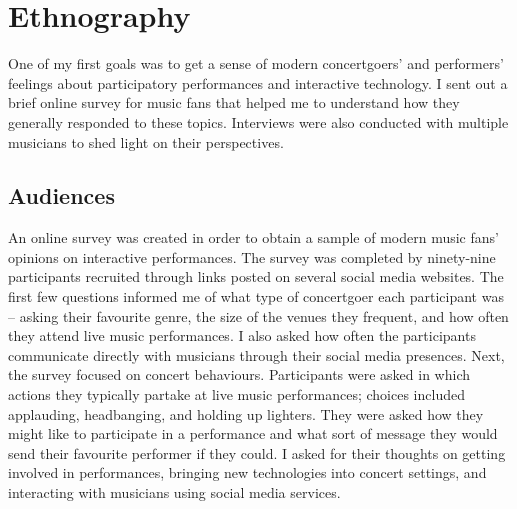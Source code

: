 \chapter{Ethnography}

One of my first goals was to get a sense of modern concertgoers' and performers' feelings about participatory performances and interactive technology. I sent out a brief online survey for music fans that helped me to understand how they generally responded to these topics. Interviews were also conducted with multiple musicians to shed light on their perspectives.

\section{Audiences}

An online survey was created in order to obtain a sample of modern music fans' opinions on interactive performances. The survey was completed by ninety-nine participants recruited through links posted on several social media websites. The first few questions informed me of what type of concertgoer each participant was -- asking their favourite genre, the size of the venues they frequent, and how often they attend live music performances. I also asked how often the participants communicate directly with musicians through their social media presences. Next, the survey focused on concert behaviours. Participants were asked in which actions they typically partake at live music performances; choices included applauding, headbanging, and holding up lighters. They were asked how they might like to participate in a performance and what sort of message they would send their favourite performer if they could. I asked for their thoughts on getting involved in performances, bringing new technologies into concert settings, and interacting with musicians using social media services.

